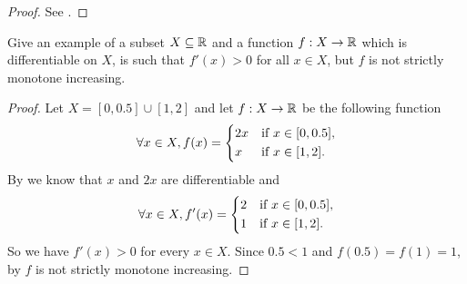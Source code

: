 \begin{proof}
  See .
\end{proof}

\begin{ex}\label{i:ex:10.3.5}
  Give an example of a subset \(X \subseteq \mathbb{R}\) and a function \(f : X \to \mathbb{R}\) which is differentiable on \(X\), is such that \(f'(x) > 0\) for all \(x \in X\), but \(f\) is not strictly monotone increasing.
\end{ex}

\begin{proof}
  Let \(X = [0, 0.5] \cup [1, 2]\) and let \(f : X \to \mathbb{R}\) be the following function
  \[
    \forall x \in X, f(x) = \begin{dcases}
      2x & \text{if } x \in [0, 0.5], \\
      x  & \text{if } x \in [1, 2].
    \end{dcases}
  \]
  By  we know that \(x\) and \(2x\) are differentiable and
  \[
    \forall x \in X, f'(x) = \begin{dcases}
      2 & \text{if } x \in [0, 0.5], \\
      1 & \text{if } x \in [1, 2].
    \end{dcases}
  \]
  So we have \(f'(x) > 0\) for every \(x \in X\).
  Since \(0.5 < 1\) and \(f(0.5) = f(1) = 1\), by  \(f\) is not strictly monotone increasing.
\end{proof}
